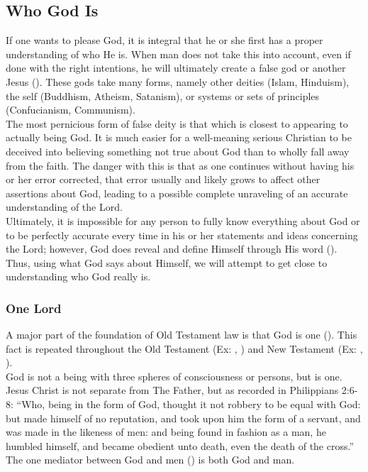 \subsection{Who God Is}
\noindent
If one wants to please God, it is integral that he or she first has a proper understanding of who He is.
When man does not take this into account, even if done with the right intentions, he will ultimately create a false god or another Jesus ().
These gods take many forms, namely other deities (Islam, Hinduism), the self (Buddhism, Atheism, Satanism), or systems or sets of principles (Confucianism, Communism).
\\

\noindent
The most pernicious form of false deity is that which is closest to appearing to actually being God.
It is much easier for a well-meaning serious Christian to be deceived into believing something not true about God than to wholly fall away from the faith.
The danger with this is that as one continues without having his or her error corrected, that error usually and likely grows to affect other assertions about God, leading to a possible complete unraveling of an accurate understanding of the Lord.
\\

\noindent
Ultimately, it is impossible for any person to fully know everything about God or to be perfectly accurate every time in his or her statements and ideas concerning the Lord; however, God does reveal and define Himself through His word ().
Thus, using what God says about Himself, we will attempt to	get close to understanding who God really is.
\\

\subsubsection{One Lord}
\noindent
A major part of the foundation of Old Testament law is that God is one ().
This fact is repeated throughout the Old Testament (Ex: , ) and New Testament (Ex: , ).
\\

\noindent
God is not a being with three spheres of consciousness or persons, but is one.
Jesus Christ is not separate from The Father, but as recorded in Philippians 2:6-8: ``Who, being in the form of God, thought it not robbery to be equal with God: but made himself of no reputation, and took upon him the form of a servant, and was made in the likeness of men: and being found in fashion as a man, he humbled himself, and became obedient unto death, even the death of the cross.''
The one mediator between God and men () is both God and man.
\\

